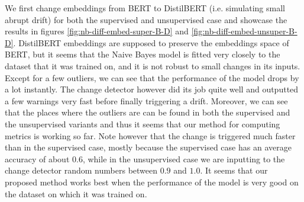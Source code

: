 \documentclass[12pt]{extreport}
\begin{document}
We first change embeddings from BERT to DistilBERT (i.e. simulating small abrupt drift) for both the supervised and unsupervised case and showcase the results in figures \ref{fig:nb-diff-embed-super-B-D} and \ref{fig:nb-diff-embed-unsuper-B-D}. DistilBERT embeddings are supposed to preserve the embeddings space of BERT, but it seems that the Naive Bayes model is fitted very closely to the dataset that it was trained on, and it is not robust to small changes in its inputs. Except for a few outliers, we can see that the performance of the model drops by a lot instantly. The change detector however did its job quite well and outputted a few warnings very fast before finally triggering a drift. Moreover, we can see that the places where the outliers are can be found in both the supervised and the unsupervised variants and thus it seems that our method for computing metrics is working so far. Note however that the change is triggered much faster than in the supervised case, mostly because the supervised case has an average accuracy of about $0.6$, while in the unsupervised case we are inputting to the change detector random numbers between $0.9$ and $1.0$. It seems that our proposed method works best when the performance of the model is very good on the dataset on which it was trained on.
\end{document}

